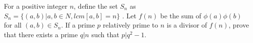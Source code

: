 For a positive integer $n$, define the set $S_n$ as $S_n =\{(a, b)|a, b \in N, lcm[a, b] = n\}$ .
Let $f(n)$ be the sum of $\phi (a)\phi (b)$ for all $(a, b) \in S_n$.
If a prime $p$ relatively prime to $n$ is a divisor of $f(n)$,
prove that there exists a prime $q|n$ such that $p|q^2 - 1$.